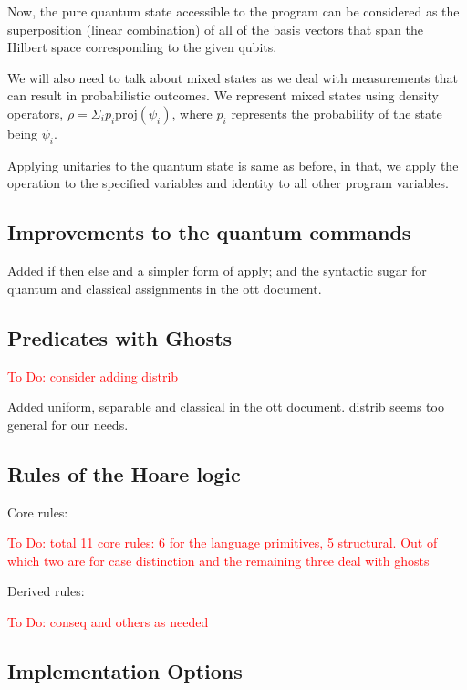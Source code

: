 \documentclass[acmsmall,nonacm,timestamp,review=false,anonymous=false]{acmart}
\newcommand{\todo}[1]{\textcolor{red}{#1}}
\begin{document}
Now, the pure quantum state accessible to the program can be considered as the superposition (linear combination) of all of the basis vectors that span the Hilbert space corresponding to the given qubits.

We will also need to talk about mixed states as we deal with measurements that can result in probabilistic outcomes. We represent mixed states using density operators, $\rho = \Sigma_i p_i \mathrm{proj}(\psi_i)$, where $p_i$ represents the probability of the state being $\psi_i$.

Applying unitaries to the quantum state is same as before, in that, we apply the operation to the specified variables and identity to all other program variables.


\subsection{Improvements to the quantum commands}

Added if then else and a simpler form of apply; and the syntactic sugar for quantum and classical assignments in the ott document.

\subsection{Predicates with Ghosts}
\todo{To Do: consider adding distrib}

Added uniform, separable and classical in the ott document. distrib seems too general for our needs.

\subsection{Rules of the Hoare logic}

Core rules:

\todo{To Do: total 11 core rules: 6 for the language primitives, 5 structural. Out of which two are for case distinction and the remaining three deal with ghosts}

Derived rules:

\todo{To Do: conseq and others as needed}

\subsection{Implementation Options}
\end{document}
